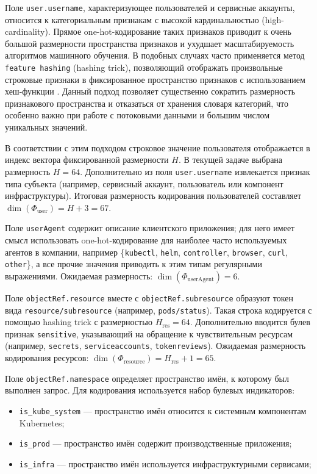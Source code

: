 Поле \texttt{user.username}, характеризующее пользователей и сервисные аккаунты, относится к категориальным признакам с высокой кардинальностью (high-cardinality). Прямое one-hot-кодирование таких признаков приводит к очень большой размерности пространства признаков и ухудшает масштабируемость алгоритмов машинного обучения. В подобных случаях часто применяется метод \texttt{feature hashing} (hashing trick), позволяющий отображать произвольные строковые признаки в фиксированное пространство признаков с использованием хеш-функции \cite{Feature_Hashing_for_Large_Scale_Multitask_Learning}. Данный подход позволяет существенно сократить размерность признакового пространства и отказаться от хранения словаря категорий, что особенно важно при работе с потоковыми данными и большим числом уникальных значений.

В соответствии с этим подходом строковое значение пользователя отображается в индекс вектора фиксированной размерности $H$. В текущей задаче выбрана размерность $H=64$. Дополнительно из поля \texttt{user.username} извлекается признак типа субъекта (например, сервисный аккаунт, пользователь или компонент инфраструктуры). Итоговая размерность кодирования пользователей составляет $\dim(\Phi_{\text{user}}) = H + 3 = 67$.

Поле \texttt{userAgent} содержит описание клиентского приложения; для него имеет смысл использовать one-hot-кодирование для наиболее часто используемых агентов в компании, например \{\texttt{kubectl}, \texttt{helm}, \texttt{controller}, \texttt{browser}, \texttt{curl}, \texttt{other}\}, а все прочие значения приводить к этим типам регулярными выражениями. Ожидаемая размерность: $\dim(\Phi_{\text{userAgent}}) = 6$.

Поле \texttt{objectRef.resource} вместе с \texttt{objectRef.subresource} образуют токен вида \texttt{resource/subresource} (например, \texttt{pods/status}). Такая строка кодируется с помощью hashing trick с размерностью $H_{\text{res}}=64$. Дополнительно вводится булев признак \texttt{sensitive}, указывающий на обращение к чувствительным ресурсам (например, \texttt{secrets}, \texttt{serviceaccounts}, \texttt{tokenreviews}). Ожидаемая размерность кодирования ресурсов: $\dim(\Phi_{\text{resource}})=H_{\text{res}}+1=65$.

Поле \texttt{objectRef.namespace} определяет пространство имён, к которому был выполнен запрос. Для кодирования используется набор булевых индикаторов:

\begin{itemize}
    \item \texttt{is\_kube\_system} — пространство имён относится к системным компонентам Kubernetes;
    \item \texttt{is\_prod} — пространство имён содержит производственные приложения;
    \item \texttt{is\_infra} — пространство имён используется инфраструктурными сервисами;
\end{itemize}

